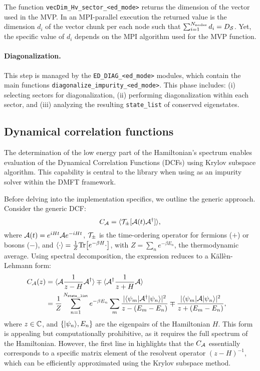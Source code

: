 \documentclass[edipack_sp.tex]{subfiles}
\begin{document}
The function {\tt vecDim\_Hv\_sector\_<ed\_mode>} returns the 
dimension of the vector used in the
MVP. In an MPI-parallel execution the returned value is the
dimension $d_i$ of the vector chunk per each node such that
$\sum_{i=1}^{N_\mathrm{nodes}}d_i = D_\SS$. Yet, the specific value of $d_i$
depends on the MPI algorithm used for the MVP function.

\paragraph{\bf Diagonalization.}
This step is managed by the {\tt ED\_DIAG\_<ed\_mode>}
modules, which contain the main functions {\tt diagonalize\_impurity\_<ed\_mode>}.
This phase includes: (i) selecting sectors for diagonalization, (ii)
performing diagonalization within each sector, and (iii) analyzing
the resulting {\tt state\_list} of conserved eigenstates.




\subsection{Dynamical correlation functions}\label{sSecGF}
The determination of the low energy part of the Hamiltonian's spectrum
enables evaluation of the Dynamical Correlation Functions (DCFs) using Krylov subspace algorithm.
This capability is central to the library when using \NAME as an
impurity solver within the DMFT framework.

Before delving into the implementation specifics, we outline the
generic approach. Consider the generic DCF:
\begin{equation}
  \label{eqGaa}
  C_\AA = \ibra \TT_\pm[ \AA(t) \AA^\dagger ]\iket,
\end{equation}
where $\AA(t)=e^{iHt}\AA e^{-iHt}$, $\TT_\pm$ is the time-ordering
operator for fermions ($+$) or
bosons ($-$), and $\ibra \cdot \iket=\frac{1}{Z}\Tr{ \left[ e^{-\beta
      H}\cdot \right]}$, with $Z=\sum_ne^{-\beta E_n}$, the thermodynamic
average.
Using spectral decomposition, the expression  reduces to a
K\"all\`en-Lehmann form:
\begin{equation}\label{KLgf}
  \begin{split}
    C_\AA(z) 
    &=  \ibra \AA \frac{1}{z-H} \AA^\dagger\iket
    \mp \ibra \AA^\dagger \frac{1}{z+H} \AA\iket \cr
    & =\frac{1}{Z}\sum_{n=1}^{N_{\tt state\_list}} e^{-\beta E_n}\sum_m
  \frac{ |\bra{\psi_m}\AA^\dagger \ket{\psi_n}|^2 }  {z-(E_m-E_n)}
  \mp
  \frac{ |\bra{\psi_m}\AA \ket{\psi_n}|^2 }  {z+(E_m-E_n)},\cr
\end{split}
\end{equation}
where $z\in\CCC$, and $\{\ket{\psi_n}, E_n\}$ are the eigenpairs of the
Hamiltonian $H$. 
This form is appealing but computationally prohibitive, as it requires
the full spectrum of the Hamiltonian. However, the first line in 
highlights that the $C_\AA$ essentially corresponds to a specific
matrix element of the resolvent operator $(z-H)^{-1}$, which can be
efficiently approximated using the Krylov subspace method.
\end{document}
